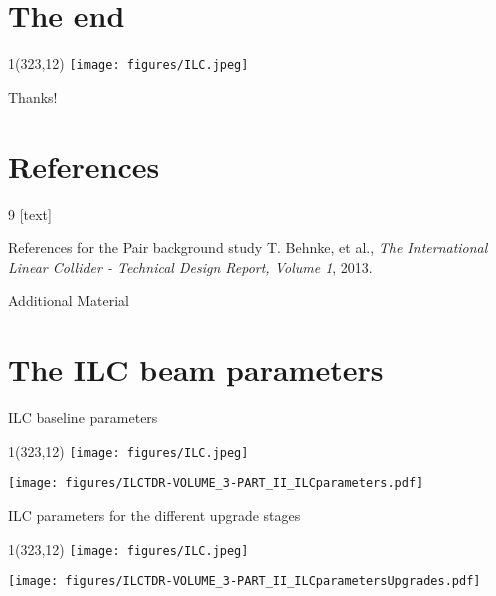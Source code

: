 \documentclass[xcolor={dvipsnames}]{beamer}
\newcommand{\ilclogo}{
  \setlength{\TPHorizModule}{1pt}
  \setlength{\TPVertModule}{1pt}
  \begin{textblock}{1}(323,12)
   \texttt{[image: figures/ILC.jpeg]}
  \end{textblock}
}
\begin{document}
\section*{The end}
{
\begin{frame}
\ilclogo
\begin{center}
\textcolor{RubineRed}{
	\LARGE Thanks!\\
}
\end{center}
\end{frame}
}

\section*{References}
\begin{thebibliography}{9}
[text]
\begin{frame}{References for the Pair background study}
\tiny
{}
 T. Behnke, et al., \emph{The International Linear Collider - Technical Design Report, Volume 1}, 2013.
\end{frame}
\end{thebibliography}

\appendix

\begin{frame}
\begin{center}
\LARGE Additional Material
\end{center}
\end{frame}

\section{The ILC beam parameters}
\begin{frame}{ILC baseline parameters}
\ilclogo
\begin{center}
	\texttt{[image: figures/ILCTDR-VOLUME\_3-PART\_II\_ILCparameters.pdf]}
\end{center}
\end{frame}
\begin{frame}{ILC parameters for the different upgrade stages}
\ilclogo
\begin{center}
	\texttt{[image: figures/ILCTDR-VOLUME\_3-PART\_II\_ILCparametersUpgrades.pdf]}
\end{center}
\end{frame}
\end{document}

